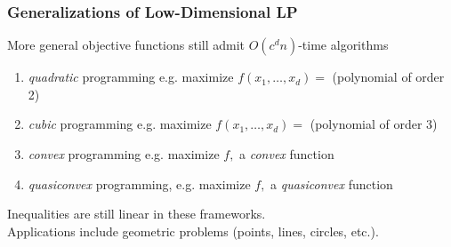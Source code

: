 \documentclass{beamer}
\begin{document}
\begin{frame} \frametitle{Generalizations of Low-Dimensional LP}
More general objective functions still admit $O(c^d n)$-time algorithms
\begin{enumerate}
  \item \emph{quadratic} programming e.g. maximize $f(x_1, \ldots, x_d) = $ (polynomial of order 2)
  \item \emph{cubic} programming e.g. maximize $f(x_1, \ldots, x_d) = $ (polynomial of order 3)
  \item \emph{convex} programming e.g. maximize $f,$ a \emph{convex} function
  \item \emph{quasiconvex} programming, e.g. maximize $f,$ a \emph{quasiconvex} function
\end{enumerate}

Inequalities are still linear in these frameworks.\\
Applications include geometric problems (points, lines, circles, etc.).
\end{frame}
\end{document}
